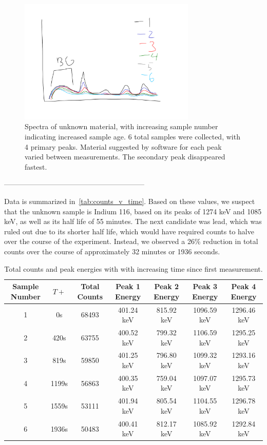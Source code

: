 \documentclass[a4paper]{article}
\begin{document}
\begin{figure}[H]
    \centering
    \includegraphics[width=0.75\textwidth]{figures/mystery_isotope.pdf}
    \caption{Spectra of unknown material, with increasing sample number indicating increased sample age. 6 total samples were collected, with 4 primary peaks. Material suggested by software for each peak varied between measurements. The secondary peak disappeared fastest.}
\end{figure}

-----------------------------------------------------------

Data is summarized in~\autoref{tab:counts_v_time}. Based on these values, we suspect that the unknown sample is Indium 116, based on its peaks of 1274 keV and 1085 keV, as well as its half life of 55 minutes. The next candidate was lead, which was ruled out due to its shorter half life, which would have required counts to halve over the course of the experiment. Instead, we observed a 26\% reduction in total counts over the course of approximately 32 minutes or 1936 seconds.
\begin{landscape}

\begin{table}[H]
    \centering
    \caption{Total counts and peak energies with with increasing time since first measurement.}
    \begin{tabular}{c c c c c c c}
        \toprule
        \textbf{Sample Number} & $T+$ & \textbf{Total Counts} & \textbf{Peak 1 Energy} & \textbf{Peak 2 Energy} & \textbf{Peak 3 Energy} & \textbf{Peak 4 Energy} \\
        \midrule
        1 & 0s & 68493 & 401.24 keV &  815.92 keV & 1096.59 keV & 1296.46 keV \\
        2 & 420s & 63755 & 400.52 keV & 799.32 keV & 1106.59 keV & 1295.25 keV \\
        3 & 819s & 59850 & 401.25 keV & 796.80 keV & 1099.32 keV  & 1293.16 keV \\
        4 & 1199s & 56863 & 400.35 keV & 759.04 keV & 1097.07 keV & 1295.73 keV \\
        5 & 1559s & 53111 & 401.94 keV & 805.54 keV & 1104.55 keV & 1296.78 keV \\
        6 & 1936s & 50483 & 400.41 keV & 812.17 keV & 1085.92 keV & 1292.84 keV \\
        \bottomrule
    \end{tabular}
    \label{tab:counts_v_time}
\end{table}

\end{landscape}
\end{document}
